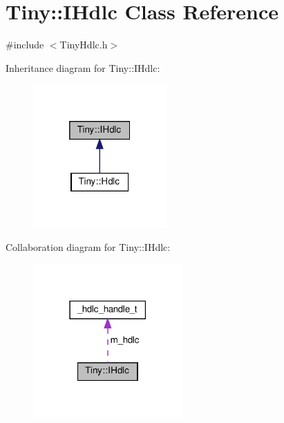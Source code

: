 \hypertarget{classTiny_1_1IHdlc}{}\section{Tiny\+:\+:I\+Hdlc Class Reference}
\label{classTiny_1_1IHdlc}


{\ttfamily \#include $<$Tiny\+Hdlc.\+h$>$}



Inheritance diagram for Tiny\+:\+:I\+Hdlc\+:
\nopagebreak
\begin{figure}[H]
\begin{center}
\leavevmode
\includegraphics[width=145pt]{classTiny_1_1IHdlc__inherit__graph}
\end{center}
\end{figure}


Collaboration diagram for Tiny\+:\+:I\+Hdlc\+:
\nopagebreak
\begin{figure}[H]
\begin{center}
\leavevmode
\includegraphics[width=162pt]{classTiny_1_1IHdlc__coll__graph}
\end{center}
\end{figure}

